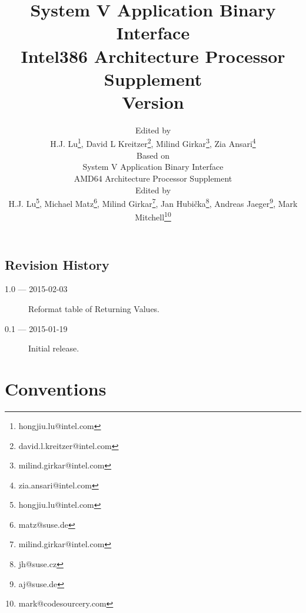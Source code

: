\documentclass[12pt]{report}
\begin{document}
\author{Edited by\\
  H.J. Lu\thanks{hongjiu.lu@intel.com},
  David L Kreitzer\thanks{david.l.kreitzer@intel.com},
  Milind Girkar\thanks{milind.girkar@intel.com},
  Zia Ansari\thanks{zia.ansari@intel.com} \\
  \small
  Based on\\
  \small
  System V Application Binary Interface\\
  \small
  AMD64 Architecture Processor Supplement\\
  \small
  Edited by\\
  \small
  H.J. Lu\thanks{hongjiu.lu@intel.com},
  Michael Matz\thanks{matz@suse.de},
  Milind Girkar\thanks{milind.girkar@intel.com},
  Jan Hubi\v{c}ka\thanks{jh@suse.cz},
  Andreas Jaeger\thanks{aj@suse.de},
  Mark Mitchell\thanks{mark@codesourcery.com}}

\title{System V Application Binary Interface\\
{\Large Intel386 Architecture Processor Supplement\\
Version \version}}
\maketitle
\tableofcontents
\listoftables
\listoffigures

\section*{Revision History}

\begin{description}

\item[1.0 --- 2015-02-03] Reformat table of Returning Values.
\item[0.1 --- 2015-01-19] Initial release.
\end{description}






\chapter{Conventions}



\appendix

\end{document}
